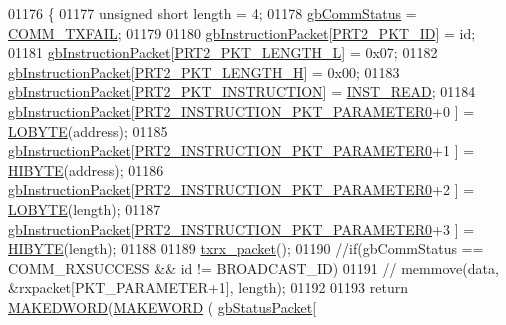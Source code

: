 \begin{DoxyCode}
01176 \{
01177     \textcolor{keywordtype}{unsigned} \textcolor{keywordtype}{short} length = 4;
01178     \hyperlink{classdynamixel2_a703e327ba8ec5909c238dc94a00cb32d}{gbCommStatus} = \hyperlink{dynamixel_8h_af88390c8be18c4079e65fd07b8d553be}{COMM\_TXFAIL}; 
01179 
01180     \hyperlink{classdynamixel2_a298efe9115fdbf77019af1001e801fb4}{gbInstructionPacket}[\hyperlink{dynamixel_8h_a3524b007f8f56ad0d80c1d0caf7e968a}{PRT2\_PKT\_ID}]                      = id;
01181     \hyperlink{classdynamixel2_a298efe9115fdbf77019af1001e801fb4}{gbInstructionPacket}[\hyperlink{dynamixel_8h_a9e77ab568957b64786c810967dec8b0c}{PRT2\_PKT\_LENGTH\_L}]                  = 0x07;
01182     \hyperlink{classdynamixel2_a298efe9115fdbf77019af1001e801fb4}{gbInstructionPacket}[\hyperlink{dynamixel_8h_a5ea18a21d722bf72217d5408c4d2a868}{PRT2\_PKT\_LENGTH\_H}]                  = 0x00;
01183     \hyperlink{classdynamixel2_a298efe9115fdbf77019af1001e801fb4}{gbInstructionPacket}[\hyperlink{dynamixel_8h_aece9dd9d7c0fa1714d53c568865d79ad}{PRT2\_PKT\_INSTRUCTION}]                = 
      \hyperlink{dynamixel_8h_a60599b6587736bb05efb8ea3c5e5f87f}{INST\_READ};
01184     \hyperlink{classdynamixel2_a298efe9115fdbf77019af1001e801fb4}{gbInstructionPacket}[\hyperlink{dynamixel_8h_a349ccb89ae957bdcc16856ec8e2dcb00}{PRT2\_INSTRUCTION\_PKT\_PARAMETER0}+0
      ]    = \hyperlink{dynamixel_8h_a04c0416272e5c07bdf955d803a21688e}{LOBYTE}(address);
01185     \hyperlink{classdynamixel2_a298efe9115fdbf77019af1001e801fb4}{gbInstructionPacket}[\hyperlink{dynamixel_8h_a349ccb89ae957bdcc16856ec8e2dcb00}{PRT2\_INSTRUCTION\_PKT\_PARAMETER0}+1
      ]    = \hyperlink{dynamixel_8h_a75c5b5f21e837e80c0feb4da9a421f87}{HIBYTE}(address);
01186     \hyperlink{classdynamixel2_a298efe9115fdbf77019af1001e801fb4}{gbInstructionPacket}[\hyperlink{dynamixel_8h_a349ccb89ae957bdcc16856ec8e2dcb00}{PRT2\_INSTRUCTION\_PKT\_PARAMETER0}+2
      ]    = \hyperlink{dynamixel_8h_a04c0416272e5c07bdf955d803a21688e}{LOBYTE}(length);
01187     \hyperlink{classdynamixel2_a298efe9115fdbf77019af1001e801fb4}{gbInstructionPacket}[\hyperlink{dynamixel_8h_a349ccb89ae957bdcc16856ec8e2dcb00}{PRT2\_INSTRUCTION\_PKT\_PARAMETER0}+3
      ]    = \hyperlink{dynamixel_8h_a75c5b5f21e837e80c0feb4da9a421f87}{HIBYTE}(length);
01188 
01189     \hyperlink{classdynamixel2_a2cccd455a52afe99a37b249aa834cdc7}{txrx\_packet}();
01190     \textcolor{comment}{//if(gbCommStatus == COMM\_RXSUCCESS && id != BROADCAST\_ID)}
01191     \textcolor{comment}{//  memmove(data, &rxpacket[PKT\_PARAMETER+1], length);}
01192 
01193     \textcolor{keywordflow}{return} \hyperlink{dynamixel_8h_a84e53a3db3f2ef95c6085d6f3531ae0e}{MAKEDWORD}(\hyperlink{dynamixel_8h_a6b98c16b8e3e7733dd4063d0b0fac24c}{MAKEWORD} ( \hyperlink{classdynamixel2_a0776f210a190cf57d1a6faf9697a593d}{gbStatusPacket}[

\end{DoxyCode}
